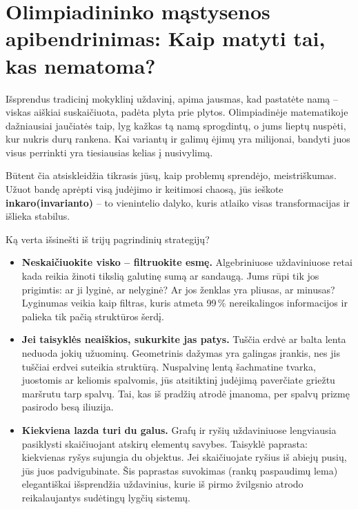 \documentclass[11pt,a4paper]{scrartcl}
\begin{document}
\section*{Olimpiadininko mąstysenos apibendrinimas: Kaip matyti tai, kas nematoma?}

Išsprendus tradicinį mokyklinį uždavinį, apima jausmas, kad pastatėte namą – viskas aiškiai suskaičiuota, padėta plyta prie plytos. Olimpiadinėje matematikoje dažniausiai jaučiatės taip, lyg kažkas tą namą sprogdintų, o jums lieptų nuspėti, kur nukris durų rankena. Kai variantų ir galimų ėjimų yra milijonai, bandyti juos visus perrinkti yra tiesiausias kelias į nusivylimą.

Būtent čia atsiskleidžia tikrasis jūsų, kaip problemų sprendėjo, meistriškumas. Užuot bandę aprėpti visą judėjimo ir keitimosi chaosą, jūs ieškote \textbf{inkaro(invarianto)} – to vienintelio dalyko, kuris atlaiko visas transformacijas ir išlieka stabilus.

Ką verta išsinešti iš trijų pagrindinių strategijų?

\begin{itemize}
    \item \textbf{Neskaičiuokite visko – filtruokite esmę.} Algebriniuose uždaviniuose retai kada reikia žinoti tikslią galutinę sumą ar sandaugą. Jums rūpi tik jos prigimtis: ar ji lyginė, ar nelyginė? Ar jos ženklas yra pliusas, ar minusas? Lyginumas veikia kaip filtras, kuris atmeta 99\,\% nereikalingos informacijos ir palieka tik pačią struktūros šerdį.
    
    \item \textbf{Jei taisyklės neaiškios, sukurkite jas patys.} Tuščia erdvė ar balta lenta neduoda jokių užuominų. Geometrinis dažymas yra galingas įrankis, nes jis tuščiai erdvei suteikia struktūrą. Nuspalvinę lentą šachmatine tvarka, juostomis ar keliomis spalvomis, jūs atsitiktinį judėjimą paverčiate griežtu maršrutu tarp spalvų. Tai, kas iš pradžių atrodė įmanoma, per spalvų prizmę pasirodo besą iliuzija.
    
    \item \textbf{Kiekviena lazda turi du galus.} Grafų ir ryšių uždaviniuose lengviausia pasiklysti skaičiuojant atskirų elementų savybes. Taisyklė paprasta: kiekvienas ryšys sujungia du objektus. Jei skaičiuojate ryšius iš abiejų pusių, jūs juos padvigubinate. Šis paprastas suvokimas (rankų paspaudimų lema) elegantiškai išsprendžia uždavinius, kurie iš pirmo žvilgsnio atrodo reikalaujantys sudėtingų lygčių sistemų.
\end{itemize}
\end{document}

